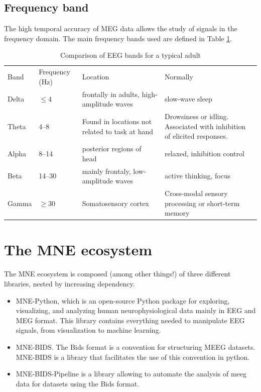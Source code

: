 \subsection{Frequency band}


The high temporal accuracy of MEG data allows the study of signals in the frequency domain. The main frequency bands used are defined in Table \ref{Tab:neural_freq_band}.

\begin{table}[ht]
    \caption{Comparison of EEG bands for a typical adult}
    \centering
    \begin{tabular}{@{}| p{1.2cm}|p{2.5cm}| p{4.5cm}|p{4.5cm}| @{}}
        \hline
        Band  & Frequency (Hz) & Location                                       & Normally                                                                \\
        Delta & $\leq  4$      & frontally in adults, high-amplitude waves      & slow-wave sleep                                                         \\
        Theta & 4–8            & Found in locations not related to task at hand & Drowsiness or idling. Associated with inhibition of elicited responses. \\
        Alpha & 8–14           & posterior regions of head                      & relaxed, inhibition control                                             \\
        Beta  & 14–30          & mainly frontaly, low-amplitude waves           & active thinking, focus                                                  \\
        Gamma & $\geq 30$      & Somatosensory cortex                           & Cross-modal sensory processing or short-term memory                     \\
        \hline
    \end{tabular}
    \label{Tab:neural_freq_band}
\end{table}


\section{The MNE ecosystem}

The MNE ecosystem is composed (among other things!) of three different libraries, nested by increasing dependency.

\begin{itemize}
    \item MNE-Python, which is an open-source Python package for exploring, visualizing, and analyzing human neurophysiological data mainly in EEG and MEG format. This library contains everything needed to manipulate EEG signals, from visualization to machine learning.
    \item MNE-BIDS. The Bids format is a convention for structuring MEEG datasets. MNE-BIDS is a library that facilitates the use of this convention in python.
    \item MNE-BIDS-Pipeline is a library allowing to automate the analysis of meeg data for datasets using the Bids format.
\end{itemize}

